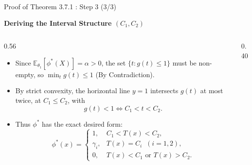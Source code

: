 \documentclass[10pt, aspectratio=169, xcolor=dvipsnames]{beamer}
\newcommand{\lead}[1]{{\color{UniBlue}\bfseries #1}}
\begin{document}
\begin{frame}{Proof of Theorem 3.7.1 : Step 3 (3/3)}
    
    \lead{Deriving the Interval Structure $(C_1, C_2)$}\\
    \vspace{0.2cm}
    
    \begin{columns}[T, onlytextwidth]
        \begin{column}{0.56\textwidth}
            \color{Slate}
            \begin{itemize}
                \setlength\itemsep{6pt}
                \item[\textcolor{Teal}{\textbullet}] Since $\mathbb{E}_{\theta_1}[\phi^*(X)] = \alpha > 0$, the set $\{t : g(t) \le 1\}$ must be non-empty, so $\min_t g(t) \le 1$ (By Contradiction).
                
                \item[\textcolor{Teal}{\textbullet}] By strict convexity, the horizontal line $y = 1$ intersects $g(t)$ at most twice, at $C_1 \le C_2$, with
                \[
                    g(t) < 1 \iff C_1 < t < C_2.
                \]
                
                \item[\textcolor{Teal}{\textbullet}] Thus $\phi^*$ has the exact desired form:
                \[
                    \phi^*(x) = \begin{cases}
                        1, & C_1 < T(x) < C_2, \\
                        \gamma_i, & T(x) = C_i \;\; (i=1,2), \\
                        0, & T(x) < C_1 \text{ or } T(x) > C_2.
                    \end{cases}
                \]
            \end{itemize}
        \end{column}
        
        \begin{column}{0.40\textwidth}
            \centering
            \vspace{0.3cm}
\end{column}
\end{columns}
\end{frame}
\end{document}
